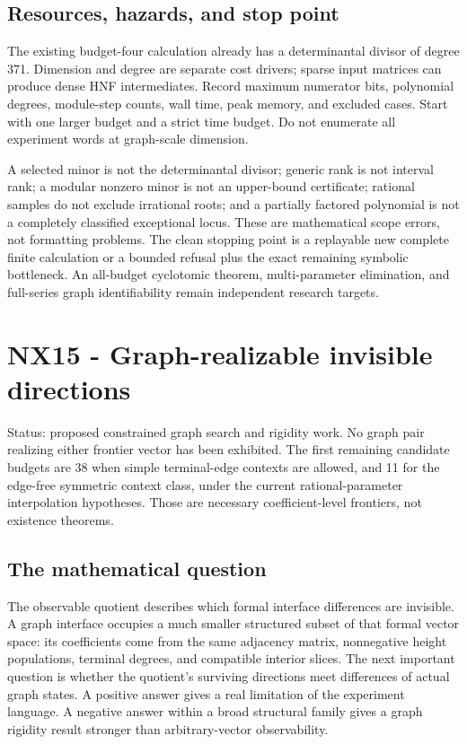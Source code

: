 \documentclass[
  11pt,
  a4paper,
]{report}
\begin{document}
\hypertarget{resources-hazards-and-stop-point}{%
\section{Resources, hazards, and stop
point}\label{resources-hazards-and-stop-point}}

The existing budget-four calculation already has a determinantal divisor
of degree 371. Dimension and degree are separate cost drivers; sparse
input matrices can produce dense HNF intermediates. Record maximum
numerator bits, polynomial degrees, module-step counts, wall time, peak
memory, and excluded cases. Start with one larger budget and a strict
time budget. Do not enumerate all experiment words at graph-scale
dimension.

A selected minor is not the determinantal divisor; generic rank is not
interval rank; a modular nonzero minor is not an upper-bound
certificate; rational samples do not exclude irrational roots; and a
partially factored polynomial is not a completely classified exceptional
locus. These are mathematical scope errors, not formatting problems. The
clean stopping point is a replayable new complete finite calculation or
a bounded refusal plus the exact remaining symbolic bottleneck. An
all-budget cyclotomic theorem, multi-parameter elimination, and
full-series graph identifiability remain independent research targets.

\hypertarget{nx15---graph-realizable-invisible-directions}{%
\chapter{NX15 - Graph-realizable invisible
directions}\label{nx15---graph-realizable-invisible-directions}}

Status: proposed constrained graph search and rigidity work. No graph
pair realizing either frontier vector has been exhibited. The first
remaining candidate budgets are 38 when simple terminal-edge contexts
are allowed, and 11 for the edge-free symmetric context class, under the
current rational-parameter interpolation hypotheses. Those are necessary
coefficient-level frontiers, not existence theorems.

\hypertarget{the-mathematical-question}{%
\section{The mathematical question}\label{the-mathematical-question}}

The observable quotient describes which formal interface differences are
invisible. A graph interface occupies a much smaller structured subset
of that formal vector space: its coefficients come from the same
adjacency matrix, nonnegative height populations, terminal degrees, and
compatible interior slices. The next important question is whether the
quotient's surviving directions meet differences of actual graph states.
A positive answer gives a real limitation of the experiment language. A
negative answer within a broad structural family gives a graph rigidity
result stronger than arbitrary-vector observability.
\end{document}

